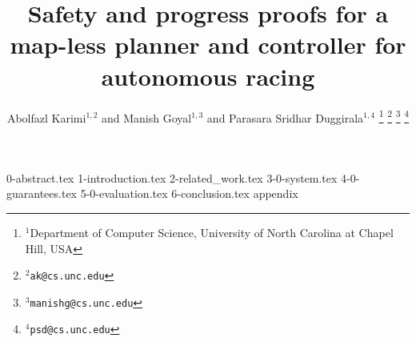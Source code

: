 \documentclass[letterpaper, 10 pt, conference]{ieeeconf}  %
\title{\LARGE \bf
Safety and progress proofs for a map-less planner and controller for autonomous racing
}
\author{Abolfazl Karimi$^{1,2}$ and Manish Goyal$^{1, 3}$ and Parasara Sridhar Duggirala$^{1, 4}$%
\thanks{$^{1}$Department of Computer Science, University of North Carolina at Chapel Hill, USA}%
\thanks{$^{2}${\tt\small ak@cs.unc.edu}}%
\thanks{$^{3}${\tt\small manishg@cs.unc.edu}}%
\thanks{$^{4}${\tt\small psd@cs.unc.edu}}%
}
\begin{document}
\maketitle
\thispagestyle{empty}
\pagestyle{empty}

{0-abstract.tex}
{1-introduction.tex}
{2-related_work.tex}
{3-0-system.tex}
{4-0-guarantees.tex}
{5-0-evaluation.tex}
{6-conclusion.tex}
{appendix}



\end{document}
